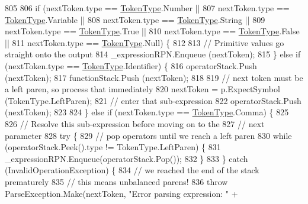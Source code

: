 \begin{DoxyCode}
805 
806                     \textcolor{keywordflow}{if} (nextToken.type == \hyperlink{a00053_a301aa7c866593a5b625a8fc158bbeace}{TokenType}.Number ||
807                         nextToken.type == \hyperlink{a00053_a301aa7c866593a5b625a8fc158bbeace}{TokenType}.Variable ||
808                         nextToken.type == \hyperlink{a00053_a301aa7c866593a5b625a8fc158bbeace}{TokenType}.String ||
809                         nextToken.type == \hyperlink{a00053_a301aa7c866593a5b625a8fc158bbeace}{TokenType}.True ||
810                         nextToken.type == \hyperlink{a00053_a301aa7c866593a5b625a8fc158bbeace}{TokenType}.False ||
811                         nextToken.type == \hyperlink{a00053_a301aa7c866593a5b625a8fc158bbeace}{TokenType}.Null) \{
812 
813                         \textcolor{comment}{// Primitive values go straight onto the output}
814                         \_expressionRPN.Enqueue (nextToken);
815                     \} \textcolor{keywordflow}{else} \textcolor{keywordflow}{if} (nextToken.type == \hyperlink{a00053_a301aa7c866593a5b625a8fc158bbeace}{TokenType}.Identifier) \{
816                         operatorStack.Push (nextToken);
817                         functionStack.Push (nextToken);
818 
819                         \textcolor{comment}{// next token must be a left paren, so process that immediately}
820                         nextToken = p.ExpectSymbol (TokenType.LeftParen);
821                         \textcolor{comment}{// enter that sub-expression}
822                         operatorStack.Push (nextToken);
823 
824                     \} \textcolor{keywordflow}{else} \textcolor{keywordflow}{if} (nextToken.type == \hyperlink{a00053_a301aa7c866593a5b625a8fc158bbeace}{TokenType}.Comma) \{
825 
826                         \textcolor{comment}{// Resolve this sub-expression before moving on to the}
827                         \textcolor{comment}{// next parameter}
828                         \textcolor{keywordflow}{try} \{
829                             \textcolor{comment}{// pop operators until we reach a left paren}
830                             \textcolor{keywordflow}{while} (operatorStack.Peek().type != TokenType.LeftParen) \{
831                                 \_expressionRPN.Enqueue(operatorStack.Pop());
832                             \}
833                         \} \textcolor{keywordflow}{catch} (InvalidOperationException) \{
834                             \textcolor{comment}{// we reached the end of the stack prematurely}
835                             \textcolor{comment}{// this means unbalanced parens!}
836                             \textcolor{keywordflow}{throw} ParseException.Make(nextToken, \textcolor{stringliteral}{"Error parsing expression: "} +

\end{DoxyCode}
